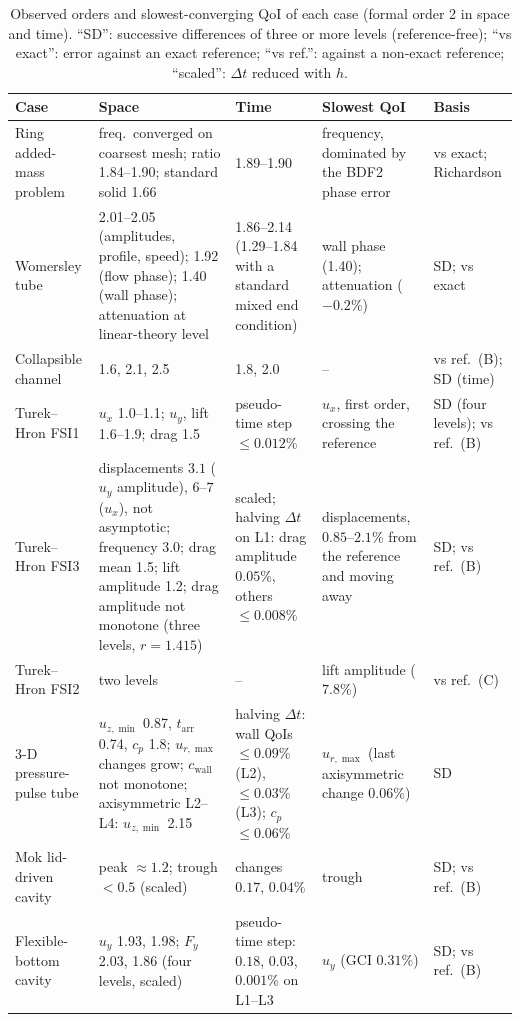 \begin{table}[htbp]
	\centering
	\footnotesize
	\setlength{\tabcolsep}{3pt}
	\caption{Observed orders and slowest-converging QoI of each case (formal order 2 in space and time). ``SD'': successive differences of three or more levels (reference-free); ``vs exact'': error against an exact reference; ``vs ref.'': against a non-exact reference; ``scaled'': $\Delta t$ reduced with $h$.}
	\label{tab:orders}
	\begin{tabular}{p{2.3cm}p{4.3cm}p{2.9cm}p{2.9cm}p{1.6cm}}
		\toprule
		Case & Space & Time & Slowest QoI & Basis \\
		\midrule
		Ring added-mass problem & freq.\ converged on coarsest mesh; ratio 1.84--1.90; standard solid 1.66 & 1.89--1.90 & frequency, dominated by the BDF2 phase error & vs exact; Richardson \\
		Womersley tube & 2.01--2.05 (amplitudes, profile, speed); 1.92 (flow phase); 1.40 (wall phase); attenuation at linear-theory level & 1.86--2.14 (1.29--1.84 with a standard mixed end condition) & wall phase (1.40); attenuation ($-0.2\%$) & SD; vs exact \\
		Collapsible channel & 1.6, 2.1, 2.5 & 1.8, 2.0 & -- & vs ref.\ (B); SD (time) \\
		Turek--Hron FSI1 & $u_x$ 1.0--1.1; $u_y$, lift 1.6--1.9; drag 1.5 & pseudo-time step $\leq0.012\%$ & $u_x$, first order, crossing the reference & SD (four levels); vs ref.\ (B) \\
		Turek--Hron FSI3 & displacements $3.1$ ($u_y$ amplitude), $6$--$7$ ($u_x$), not asymptotic; frequency 3.0; drag mean 1.5; lift amplitude 1.2; drag amplitude not monotone (three levels, $r = 1.415$) & scaled; halving $\Delta t$ on L1: drag amplitude $0.05\%$, others $\leq0.008\%$ & displacements, $0.85$--$2.1\%$ from the reference and moving away & SD; vs ref.\ (B) \\
		Turek--Hron FSI2 & two levels & -- & lift amplitude ($7.8\%$) & vs ref.\ (C) \\
		3-D pressure-pulse tube & $u_{z,\min}$ 0.87, $t_\mathrm{arr}$ 0.74, $c_p$ 1.8; $u_{r,\max}$ changes grow; $c_\mathrm{wall}$ not monotone; axisymmetric L2--L4: $u_{z,\min}$ 2.15 & halving $\Delta t$: wall QoIs $\leq0.09\%$ (L2), $\leq0.03\%$ (L3); $c_p$ $\leq0.06\%$ & $u_{r,\max}$ (last axisymmetric change $0.06\%$) & SD \\
		Mok lid-driven cavity & peak $\approx1.2$; trough $<0.5$ (scaled) & changes $0.17$, $0.04\%$ & trough & SD; vs ref.\ (B) \\
		Flexible-bottom cavity & $u_y$ 1.93, 1.98; $F_y$ 2.03, 1.86 (four levels, scaled) & pseudo-time step: $0.18$, $0.03$, $0.001\%$ on L1--L3 & $u_y$ (GCI $0.31\%$) & SD; vs ref.\ (B) \\

\end{tabular}
\end{table}

